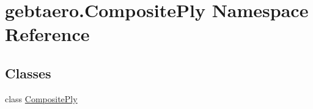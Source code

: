 \hypertarget{namespacegebtaero_1_1_composite_ply}{}\section{gebtaero.\+Composite\+Ply Namespace Reference}
\label{namespacegebtaero_1_1_composite_ply}
\subsection*{Classes}
\begin{DoxyCompactItemize}
\item 
class \hyperlink{classgebtaero_1_1_composite_ply_1_1_composite_ply}{Composite\+Ply}
\end{DoxyCompactItemize}
